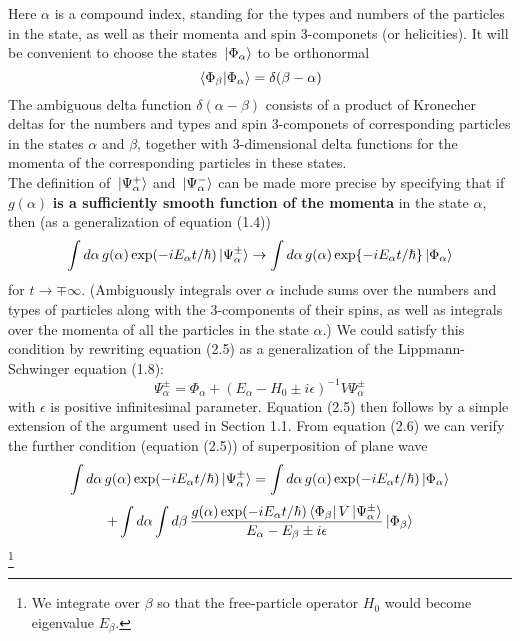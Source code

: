 \documentclass[12pt]{article}
\numberwithin{equation}{section}
\begin{document}
Here $\alpha$ is a compound index, standing for the types and numbers of the particles in the state, as well as their momenta and spin 3-componets (or helicities).
It will be convenient to choose the states $\ket*{\Phi_{\alpha}}$ to be orthonormal
\begin{equation}
    \braket*{\Phi_{\beta}}{\Phi_{\alpha}} = \delta(\beta-\alpha)
\end{equation}
The ambiguous delta function $\delta(\alpha-\beta)$ consists of a product of Kronecher deltas for the numbers and types and spin 3-componets of corresponding particles in the states $\alpha$ and $\beta$, together with 3-dimensional delta functions for the momenta of the corresponding particles in these states.
\\\indent The definition of $\ket*{\Psi_{\alpha}^{+}}$ and $\ket*{\Psi_{\alpha}^{-}}$ can be made more precise by specifying that if $g(\alpha)$ \textbf{is a sufficiently smooth function of the momenta} in the state $\alpha$, then (as a generalization of equation (1.4))
\begin{equation}
    \int{d\alpha\,g(\alpha)\exp(-iE_{\alpha}t/\hbar)\ket*{\Psi_{\alpha}^{\pm}}}\rightarrow\int{d\alpha\,g(\alpha)\exp{-iE_{\alpha}t/\hbar}\ket*{\Phi_{\alpha}}}
\end{equation}
for $t\rightarrow\mp\infty$. (Ambiguously integrals over $\alpha$ include sums over the numbers and types of particles along with the 3-components of their spins, as well as integrals over the momenta of all the particles in the state $\alpha$.)
We could satisfy this condition by rewriting equation (2.5) as a generalization of the Lippmann-Schwinger equation (1.8):
\begin{equation}
    \Psi^{\pm}_{\alpha} = \Phi_{\alpha}+\left(E_{\alpha}-H_0\pm i\epsilon\right)^{-1}V\Psi_{\alpha}^{\pm}
\end{equation}
with $\epsilon$ is positive infinitesimal parameter. Equation (2.5) then follows by a simple extension of the argument used in Section 1.1. 
From equation (2.6) we can verify the further condition (equation (2.5)) of superposition of plane wave
\[
    \int{d\alpha\,g(\alpha)\exp(-iE_{\alpha}t/\hbar)\ket*{\Psi_{\alpha}^{\pm}}} = \int{d\alpha\,g(\alpha)\exp(-iE_{\alpha}t/\hbar)\ket*{\Phi_{\alpha}}}
\]
\begin{equation}
    +\int{d\alpha}\int{d\beta\,\frac{g(\alpha)\exp(-iE_{\alpha}t/\hbar)\bra*{\Phi_{\beta}}V\ket*{\Psi_{\alpha}^{\pm}}}{E_{\alpha}-E_{\beta}\pm i\epsilon}\ket*{\Phi_{\beta}}}
\end{equation}\footnote{We integrate over $\beta$ so that the free-particle operator $H_0$ would become eigenvalue $E_{\beta}$.}
\end{document}
